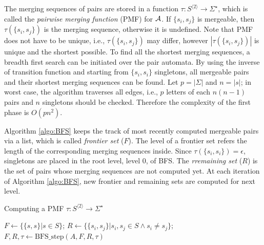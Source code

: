 \documentclass[12pt]{article}
\begin{document}
The merging sequences of pairs are stored in a function $\tau : S^{\langle 2 \rangle} \rightarrow \Sigma^\star$, which is called the \textit{pairwise merging function} (PMF) for ${\cal A}$. If $\{ s_i, s_j \}$ is mergeable, then $\tau(\{ s_i, s_j \})$ is the merging sequence, otherwise it is undefined. Note that PMF does not have to be unique, i.e., $\tau(\{ s_i, s_j \})$ may differ, however  $|\tau(\{ s_i, s_j \})|$ is unique and the shortest possible. To find all the shortest merging sequences, a breadth first search can be initiated over the pair automata. By using the inverse of transition function and starting from $\{ s_i, s_i \}$ singletons, all mergeable pairs and their shortest merging sequences can be found. Let $p=|\Sigma|$ and $n=|s|$; in worst case, the algorithm traverses all edges, i.e., $p$ letters of each $n(n-1)$ pairs and $n$ singletons should be checked. Therefore the complexity of the first phase is $O(pn^2)$. 

Algorithm \ref{algo:BFS} keeps the track of most recently computed mergeable pairs via a list, which is called \textit{frontier set} ($F$). The level of a frontier set refers the length of the corresponding merging sequences inside. Since $\tau(\{ s_i, s_i \})=\epsilon$, singletons are placed in the root level, level 0, of BFS. The \textit{rremaining set} ($R$) is the set of pairs whose merging sequences are not computed yet. At each iteration of Algorithm \ref{algo:BFS}, new frontier and remaining sets are computed for next level. 


\begin{algorithm}[ht]
	\caption{Computing a PMF $\tau : S^{\langle 2 \rangle} \rightarrow \Sigma^\star$}
	\label{algo:BFS}
	
	
	$F \longleftarrow \{ \{ s,s \} | s \in S \}$; 
    $R \longleftarrow \{ \{ s_i, s_j \} | s_i,s_j \in S \wedge s_i \neq s_j \}$; 
	{
		$F,R,\tau \longleftarrow \mbox{BFS\_step}(A,F,R,\tau)$\;
	}
\end{algorithm}
\end{document}
